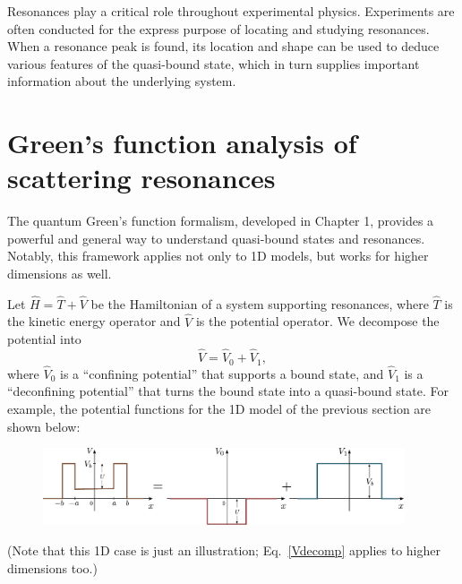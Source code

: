 \documentclass[pra,12pt]{revtex4}
\begin{document}
Resonances play a critical role throughout experimental physics.
Experiments are often conducted for the express purpose of locating
and studying resonances.  When a resonance peak is found, its location
and shape can be used to deduce various features of the quasi-bound
state, which in turn supplies important information about the
underlying system.

\section{Green's function analysis of scattering resonances}
\label{sec:green_resonances}

The quantum Green's function formalism, developed in Chapter 1,
provides a powerful and general way to understand quasi-bound states
and resonances.  Notably, this framework applies not only to 1D
models, but works for higher dimensions as well.

Let $\hat{H} = \hat{T} + \hat{V}$ be the Hamiltonian of a system
supporting resonances, where $\hat{T}$ is the kinetic energy operator
and $\hat{V}$ is the potential operator.  We decompose the potential
into
\begin{equation}
  \hat{V} = \hat{V}_0 + \hat{V}_1,
  \label{Vdecomp}
\end{equation}
where $\hat{V}_0$ is a ``confining potential'' that supports a bound
state, and $\hat{V}_1$ is a ``deconfining potential'' that turns the
bound state into a quasi-bound state.  For example, the potential
functions for the 1D model of the previous section are shown below:

\begin{figure}[h]
  \centering\includegraphics[width=0.95\textwidth]{resonancewell_decomp}
\end{figure}

\noindent
(Note that this 1D case is just an illustration; Eq.~\eqref{Vdecomp}
applies to higher dimensions too.)
\end{document}
